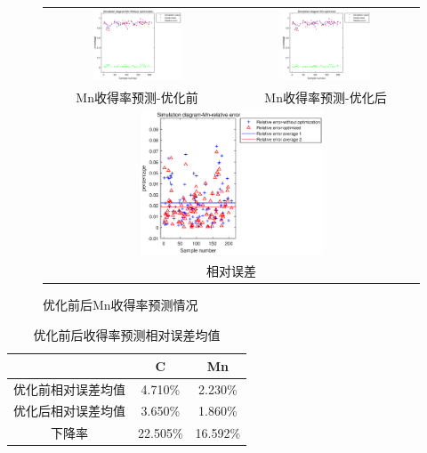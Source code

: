 \documentclass[12pt]{article}%
\begin{document}
\begin{figure}[htbp]
  \centering
  \begin{tabular}{cc}
   \includegraphics[width=0.5\textwidth]{picture/Mn1}  &\includegraphics[width=0.5\textwidth]{picture/Mn2}   \\
    Mn收得率预测-优化前  &  Mn收得率预测-优化后 \\
    \multicolumn{2}{c}{ \includegraphics[width=0.5\textwidth]{picture/Mn3}}   \\
     \multicolumn{2}{c}{相对误差}   \\
  \end{tabular}
  \caption{优化前后Mn收得率预测情况}\label{fig:Mnyouhua}
\end{figure}

\begin{table}[htbp]
  \centering
  \caption{优化前后收得率预测相对误差均值}
    \begin{tabular}{ccc}
    \hline
      & C & Mn \\
      \hline
    优化前相对误差均值 & 4.710\% & 2.230\% \\
    优化后相对误差均值 & 3.650\% & 1.860\% \\
    下降率 & 22.505\% & 16.592\% \\
    \hline
    \end{tabular}%
  \label{tab:gaibian}%
\end{table}%
\end{document}

